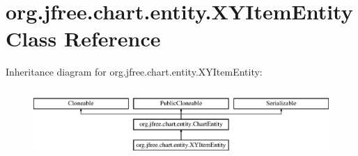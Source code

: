 \hypertarget{classorg_1_1jfree_1_1chart_1_1entity_1_1_x_y_item_entity}{}\section{org.\+jfree.\+chart.\+entity.\+X\+Y\+Item\+Entity Class Reference}
\label{classorg_1_1jfree_1_1chart_1_1entity_1_1_x_y_item_entity}
Inheritance diagram for org.\+jfree.\+chart.\+entity.\+X\+Y\+Item\+Entity\+:\begin{figure}[H]
\begin{center}
\leavevmode
\includegraphics[height=2.654028cm]{classorg_1_1jfree_1_1chart_1_1entity_1_1_x_y_item_entity}
\end{center}
\end{figure}
